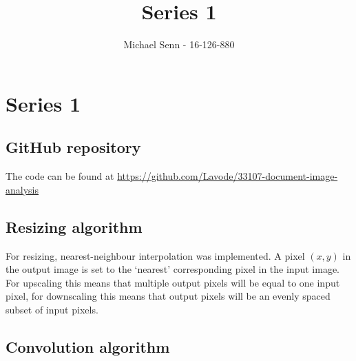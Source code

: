 \documentclass[a4paper]{scrreprt}
\title{Series 1}
\author{Michael Senn \maillink{michael.senn@students.unibe.ch} - 16-126-880}
\date{\printdate}
\DeclarePairedDelimiter\floor{\lfloor}{\rfloor}
\newcommand{\var}[1]{\textit{#1}}
\begin{document}
\maketitle


\setcounter{chapter}{0}

\chapter{Series 1}

\section{GitHub repository}

The code can be found at \url{https://github.com/Lavode/33107-document-image-analysis}

\section{Resizing algorithm}

For resizing, nearest-neighbour interpolation was implemented. A pixel $(x, y)$
in the output image is set to the `nearest' corresponding pixel in the input
image.  For upscaling this means that multiple output pixels will be equal to
one input pixel, for downscaling this means that output pixels will be an
evenly spaced subset of input pixels.


\section{Convolution algorithm}
\end{document}
